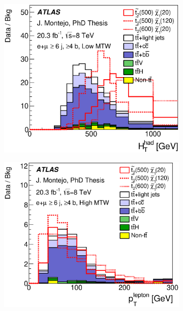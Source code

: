 \begin{figure}[!tp]
\begin{subfigure}{0.32\textwidth}
\caption{}\end{subfigure}
\begin{subfigure}{0.32\textwidth}
\includegraphics[trim=0cm 5cm 0cm 0cm, clip=true, width=\textwidth]{Analysis/Figures_stop2/plots_stop2_lowMTW/ELEMUON/6jetin/4btagin/HTj_ELEMUON_6jetin4btagin_NOMINAL} \\
\caption{}\end{subfigure}
\begin{subfigure}{0.32\textwidth}
\includegraphics[trim=0cm 5cm 0cm 0cm, clip=true, width=\textwidth]{Analysis/Figures_stop2/plots_stop2_highMTW/ELEMUON/6jetin/4btagin/lep_pt_ELEMUON_6jetin4btagin_NOMINAL}

\end{subfigure}
\end{figure}

